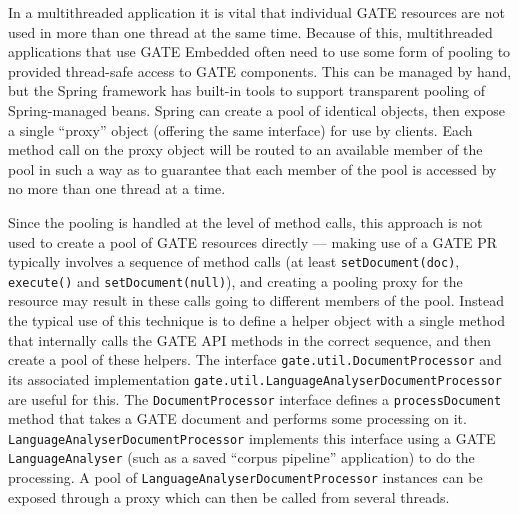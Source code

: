 
In a multithreaded application it is vital that individual GATE resources are
not used in more than one thread at the same time.  Because of this,
multithreaded applications that use GATE Embedded often need to use some form
of pooling to provided thread-safe access to GATE components.  This can be
managed by hand, but the Spring framework has built-in tools to support
transparent pooling of Spring-managed beans.  Spring can create a pool of
identical objects, then expose a single ``proxy'' object (offering the same
interface) for use by clients.  Each method call on the proxy object will be
routed to an available member of the pool in such a way as to guarantee that
each member of the pool is accessed by no more than one thread at a time.

Since the pooling is handled at the level of method calls, this approach is not
used to create a pool of GATE resources directly --- making use of a GATE PR
typically involves a sequence of method calls (at least \verb|setDocument(doc)|,
\verb|execute()| and \verb|setDocument(null)|), and creating a pooling proxy
for the resource may result in these calls going to different members of the
pool.  Instead the typical use of this technique is to define a helper object
with a single method that internally calls the GATE API methods in the correct
sequence, and then create a pool of these helpers.  The interface
\verb|gate.util.DocumentProcessor| and its associated implementation
\verb|gate.util.LanguageAnalyserDocumentProcessor| are useful for this.  The
\verb|DocumentProcessor| interface defines a \verb|processDocument| method that
takes a GATE document and performs some processing on it.
\verb|LanguageAnalyserDocumentProcessor| implements this interface using a GATE
\verb|LanguageAnalyser| (such as a saved ``corpus pipeline'' application) to do
the processing.  A pool of \verb|LanguageAnalyserDocumentProcessor| instances
can be exposed through a proxy which can then be called from several threads.

